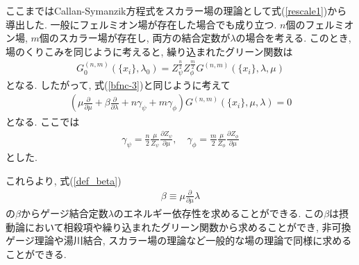 ここまではCallan-Symanzik方程式をスカラー場の理論として式(\ref{rescale1})から導出した.
一般にフェルミオン場が存在した場合でも成り立つ.
$n$個のフェルミオン場, $m$個のスカラー場が存在し, 両方の結合定数が$\lambda$の場合を考える.
このとき, 場のくりこみを同じように考えると, 繰り込まれたグリーン関数は
\begin{align}
  G_0^{(n,m)}(\{x_i\},\lambda_0) = Z_\psi^{\frac{n}{2}} Z_\phi^{\frac{m}{2}}G^{(n,m)}(\{x_i\},\lambda,\mu)\label{renormalized_G}
\end{align}
となる.
したがって, 式(\ref{bfnc-3})と同じように考えて
\begin{align}
  \left(\mu\frac{\partial}{\partial \mu} + \beta\frac{\partial}{\partial \lambda} + n\gamma_\psi + m \gamma_\phi \right)G^{(n,m)}(\{x_i\},\mu,\lambda) = 0\label{renormalized_CS}
\end{align}
となる.
ここでは
\begin{align}
  \gamma_\psi = \frac{n}{2}\frac{\mu}{Z_\psi}\frac{\partial Z_\psi}{\partial \mu},\quad \gamma_\phi = \frac{m}{2}\frac{\mu}{Z_\phi}\frac{\partial Z_\phi}{\partial \mu}\label{def_gamma2}
\end{align}
とした.

これらより, 式(\ref{def_beta})
\begin{align}
  \beta \equiv \mu\frac{\partial}{\partial \mu}\lambda\nonumber
\end{align}
の$\beta$からゲージ結合定数$\lambda$のエネルギー依存性を求めることができる.
この$\beta$は摂動論において相殺項や繰り込まれたグリーン関数から求めることができ, 非可換ゲージ理論や湯川結合, スカラー場の理論など一般的な場の理論で同様に求めることができる.
\cite{chengHiggsPhenomenaAsymptotically1974,
machacekFermionHiggsMasses1981,
machacekTwoloopRenormalizationGroup1983,
machacekTwoloopRenormalizationGroup1984,
machacekTwoloopRenormalizationGroup1985,
maVariationMixingAngles1979,
vaughnRenormalizationGroupConstraints1982}
